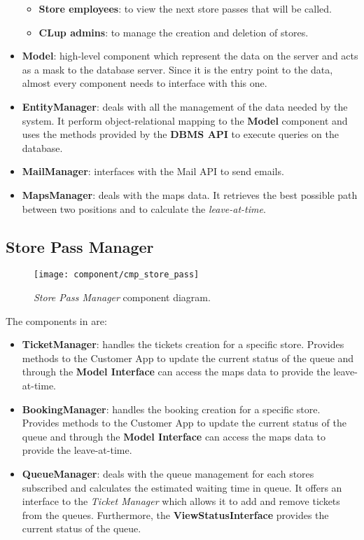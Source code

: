 \begin{itemize}
\begin{itemize}
		\item \textbf{Store employees}: to view the next store passes that will be called.
		\item \textbf{CLup admins}: to manage the creation and deletion of stores.
	\end{itemize}
	
	\item \textbf{Model}: high-level component which represent the data on the server and acts as a mask to the database server. Since it is the entry point to the data, almost every component needs to interface with this one.
	
	\item \textbf{EntityManager}: deals with all the management of the data needed by the system. It perform object-relational mapping to the \textbf{Model} component and uses the methods provided by the \textbf{DBMS API} to execute queries on the database.
	
	\item \textbf{MailManager}: interfaces with the Mail API to send emails.	
	
	\item \textbf{MapsManager}: deals with the maps data. It retrieves the best possible path between two positions and to calculate the \textit{leave-at-time}.
\end{itemize}

\clearpage

\subsection{Store Pass Manager}

\begin{figure}[H]
	\centering
	\texttt{[image: component/cmp\_store\_pass]}
	\caption{\textit{Store Pass Manager} component diagram.}
	\label{fig:cmp_store_pass}
\end{figure}

The components in  are:
\begin{itemize}
	\item \textbf{TicketManager}: handles the tickets creation for a specific store. Provides methods to the Customer App to update the current status of the queue and through the \textbf{Model Interface} can access the maps data to provide the leave-at-time.
	
	\item \textbf{BookingManager}: handles the booking creation for a specific store. Provides methods to the Customer App to update the current status of the queue and through the \textbf{Model Interface} can access the maps data to provide the leave-at-time.
	
	\item \textbf{QueueManager}: deals with the queue management for each stores subscribed and calculates the estimated waiting time in queue. It offers an interface to the \textit{Ticket Manager} which allows it to add and remove tickets from the queues. Furthermore, the \textbf{ViewStatusInterface} provides the current status of the queue.
\end{itemize}


